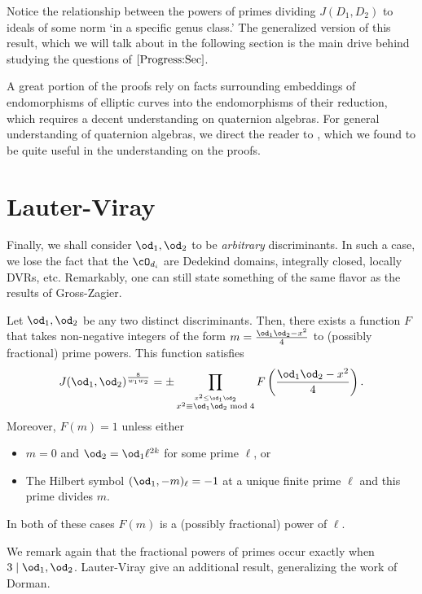 \documentclass[11pt, proquest]{uwthesis}
\begin{document}
Notice the relationship between the powers of primes dividing $J(D_1,D_2)$ to ideals of some norm `in a specific genus class.' The generalized version of this result, which we will talk about in the following section is the main drive behind studying the questions of \textsection$\ref{Progress:Sec}$.


\begin{remark}
  A great portion of the proofs rely on facts surrounding embeddings of endomorphisms of elliptic curves  into the endomorphisms of their reduction, which requires a decent understanding on quaternion algebras. For general understanding of quaternion algebras, we direct the reader to \cite{Voight:quaternion}, which we found to be quite useful in the understanding on the proofs.
\end{remark}

\section{Lauter-Viray}
Finally, we shall consider $\od_1,\od_2$ to be {\it arbitrary} discriminants.
In such a case, we lose the fact that the $\cO_{d_i}$ are Dedekind domains, integrally closed, locally DVRs, etc.
Remarkably, one can still state something of the same flavor as the results of Gross-Zagier.

\begin{theorem}
  Let $\od_1,\od_2$ be any two distinct discriminants. Then, there exists a function $F$ that takes non-negative integers of the form $m = \frac{\od_1\od_2 - x^2}{4}$ to (possibly fractional) prime powers. This function satisfies
  $$J(\od_1,\od_2)^{\frac{8}{w_1w_2}} = \pm \prod_{\stackrel{x^2\leq\od_1\od_2}{x^2\equiv \od_1\od_2\bmod 4}} F\left(\frac{\od_1\od_2 - x^2}{4}\right).$$
  Moreover, $F(m) = 1$ unless either
  \begin{itemize}
    \item $m = 0$ and $\od_2 = \od_1\ell^{2k}$ for some prime $\ell$, or
    \item The Hilbert symbol $(\od_1,-m)_{\ell} = -1$ at a unique finite prime $\ell$ and this prime divides $m$.
  \end{itemize}
  In both of these cases $F(m)$ is a (possibly fractional) power of $\ell$.
\end{theorem}

We remark again that the fractional powers of primes occur exactly when $3\mid \od_1,\od_2$. Lauter-Viray give an additional result, generalizing the work of Dorman.
\end{document}
